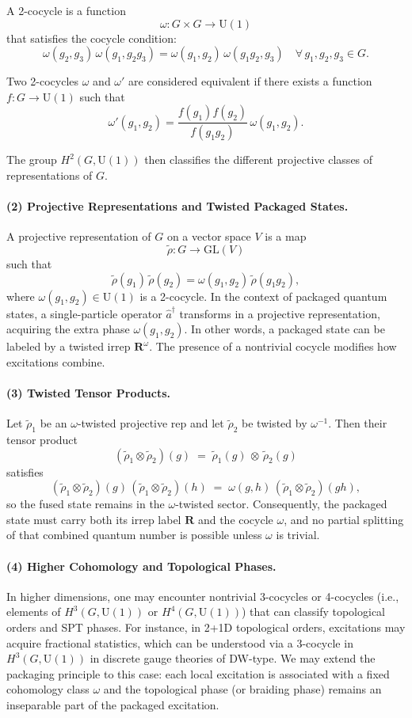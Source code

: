 \documentclass[12pt,a4paper]{article}
\begin{document}
A 2-cocycle is a function
\[
\omega: G \times G \to \mathrm{U}(1)
\]
that satisfies the cocycle condition:
\[
\omega(g_2, g_3)\, \omega(g_1, g_2 g_3) = \omega(g_1, g_2)\, \omega(g_1 g_2, g_3) \quad \forall\, g_1,g_2,g_3 \in G.
\]


Two 2-cocycles $\omega$ and $\omega'$ are considered equivalent if there exists a function $f: G \to \mathrm{U}(1)$ such that
\[
\omega'(g_1,g_2) = \frac{f(g_1) f(g_2)}{f(g_1 g_2)}\, \omega(g_1,g_2).
\]


The group $H^2(G, \mathrm{U}(1))$ then classifies the different projective classes of representations of $G$.


\paragraph{(2) Projective Representations and Twisted Packaged States.}
A projective representation of $G$ on a vector space $V$ is a map
\[
\tilde{\rho}: G \to \mathrm{GL}(V)
\]
such that
\[
\tilde{\rho}(g_1)\,\tilde{\rho}(g_2) = \omega(g_1,g_2)\, \tilde{\rho}(g_1g_2),
\]
where $\omega(g_1,g_2) \in \mathrm{U}(1)$ is a 2-cocycle.
In the context of packaged quantum states, a single-particle operator $\hat{a}^\dagger$ transforms in a projective representation, acquiring the extra phase $\omega(g_1,g_2)$.
In other words, a packaged state can be labeled by a twisted irrep $\mathbf{R}^\omega$.
The presence of a nontrivial cocycle modifies how excitations combine.


\paragraph{(3) Twisted Tensor Products.}
Let $\tilde\rho_1$ be an $\omega$-twisted projective rep and let $\tilde\rho_2$ be twisted by $\omega^{-1}$.
Then their tensor product
$$
(\tilde\rho_1\otimes\tilde\rho_2)(g)
\;=\;
\tilde\rho_1(g)\,\otimes\,\tilde\rho_2(g)
$$
satisfies
$$
(\tilde\rho_1\otimes\tilde\rho_2)(g)\,
(\tilde\rho_1\otimes\tilde\rho_2)(h)
\;=\;
\omega(g,h)\,
(\tilde\rho_1\otimes\tilde\rho_2)(gh),
$$
so the fused state remains in the $\omega$-twisted sector.
Consequently, the packaged state must carry both its irrep label $\mathbf R$ and the cocycle $\omega$, and no partial splitting of that combined quantum number is possible unless $\omega$ is trivial.


\paragraph{(4) Higher Cohomology and Topological Phases.}
In higher dimensions, one may encounter nontrivial 3-cocycles or 4-cocycles (i.e., elements of $H^3(G, \mathrm{U}(1))$ or $H^4(G, \mathrm{U}(1))$) that can classify topological orders and SPT phases.
For instance, in 2+1D topological orders, excitations may acquire fractional statistics, which can be understood via a 3-cocycle in $H^3(G, \mathrm{U}(1))$ in discrete gauge theories of DW-type.
We may extend the packaging principle to this case:
each local excitation is associated with a fixed cohomology class $\omega$ and the topological phase (or braiding phase) remains an inseparable part of the packaged excitation.
\end{document}
